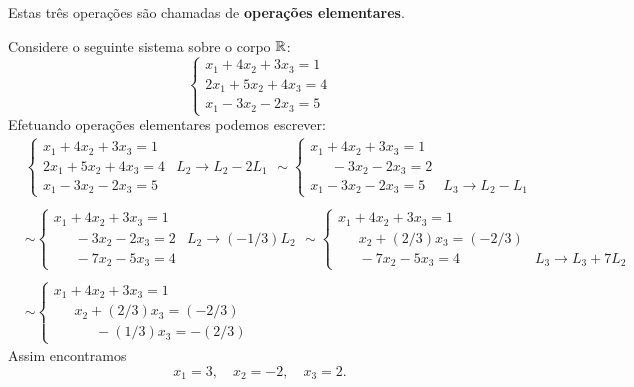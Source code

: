 Estas tr\^es opera\c{c}\~oes s\~ao chamadas de \textbf{opera\c{c}\~oes elementares}.

\begin{exemplo}
	Considere o seguinte sistema sobre o corpo $\mathbb{R}$:
	\[
		\begin{cases}
			x_1 + 4x_2 + 3x_3 = 1\\
			2x_1 + 5x_2 + 4x_3 = 4\\
			x_1 - 3x_2 - 2x_3 = 5
		\end{cases}
	\]
	Efetuando opera\c{c}\~oes elementares podemos escrever:
	\begin{align*}
		&\begin{cases}
			x_1 + 4x_2 + 3x_3 = 1\\
			2x_1 + 5x_2 + 4x_3 = 4 & L_2 \rightarrow L_2 - 2L_1\\
			x_1 - 3x_2 - 2x_3 = 5
		\end{cases} \sim
		\begin{cases}
			x_1 + 4x_2 + 3x_3 = 1\\
			\phantom{0x_1} -3x_2 - 2x_3 = 2\\
			x_1 - 3x_2 - 2x_3 = 5 & L_3 \rightarrow L_2 - L_1
		\end{cases}\\ \\ & \sim
		\begin{cases}
			x_1 + 4x_2 + 3x_3 = 1\\
			\phantom{0x_1} - 3x_2 - 2x_3 = 2 & L_2 \rightarrow (-1/3)L_2\\
			\phantom{0x_1} - 7x_2 - 5x_3 = 4
		\end{cases} \sim
		\begin{cases}
			x_1 + 4x_2 + 3x_3 = 1\\
			\phantom{0x_1} x_2 + (2/3)x_3 = (-2/3)\\
			\phantom{0x_1} - 7x_2 - 5x_3 = 4 & L_3 \rightarrow L_3 + 7L_2
		\end{cases}\\ \\ & \sim
		\begin{cases}
			x_1 + 4x_2 + 3x_3 = 1\\
			\phantom{0x_1} x_2 + (2/3)x_3 = (-2/3)\\
			\phantom{0x_1} \phantom{0x_2}  -(1/3)x_3 = -(2/3)
		\end{cases}
	\end{align*}
	Assim encontramos
	\[
		x_1 = 3, \quad x_2 = -2, \quad x_3 = 2.
	\]
\end{exemplo}


